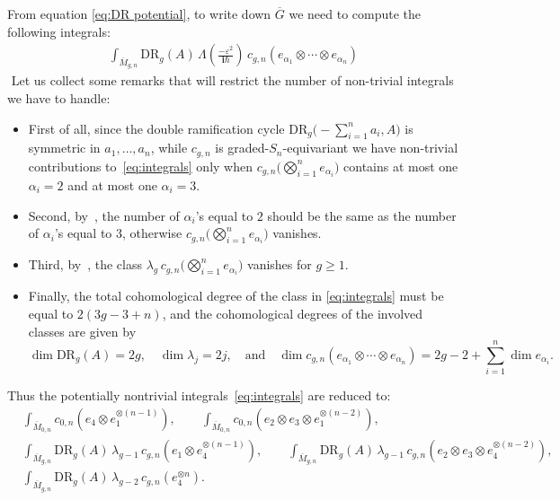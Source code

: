 \documentclass{amsart}
\numberwithin{equation}{section} %
\theoremstyle{plain}
\theoremstyle{remark}
\def\cxi{\mathbf{i}}
\begin{document}
From equation \eqref{eq:DR potential}, to write down $\overline{G}$ we need to compute the following integrals:
\begin{align}\label{eq:integrals}
\int_{\overline{M}_{g,n}} \mathrm{DR}_{g}(A)\, \Lambda( \tfrac{-\varepsilon^2}{\cxi\hbar}) \,  c_{g,n}(e_{\alpha_{1}} \otimes \cdots \otimes e_{\alpha_{n}})
\end{align}
﻿
Let us collect some remarks that will restrict the number of non-trivial integrals we have to handle:
\begin{itemize}
	\item First of all, since the double ramification cycle $\mathrm{DR}_{g}\big( -\textstyle\sum_{i=1}^n a_{i}, A\big)$ is symmetric in $a_1,\dots,a_n$, while $c_{g,n}$ is graded-$S_n$-equivariant we have non-trivial contributions to~\eqref{eq:integrals} only when $c_{g,n}\big(\bigotimes_{i=1}^n e_{\alpha_i} \big)$ contains at most one $\alpha_i=2$ and at most one $\alpha_i=3$.
	\item Second, by~\cite{janda-targetcurves}, the number of $\alpha_i$'s equal to $2$ should be the same as the number of $\alpha_i$'s equal to $3$, otherwise $c_{g,n}\big(\bigotimes_{i=1}^n e_{\alpha_i}\big)$ vanishes. 
	\item Third, by~\cite{pixton_oberdieck_23}, the class $\lambda_g \, c_{g,n}\big(\bigotimes_{i=1}^n e_{\alpha_i}\big)$ vanishes for $g\geq 1$.
	\item Finally, the total cohomological degree of the class in \eqref{eq:integrals} must be equal to $2(3g-3+n)$, and the cohomological degrees of the involved classes are given by 
	\[
	\dim \mathrm{DR}_{g}(A) = 2g, \quad \dim \lambda_j = 2j, \quad \text{and} \quad  \dim c_{g,n}(e_{\alpha_{1}} \otimes \cdots \otimes e_{\alpha_{n}}) = 2g-2+\textstyle\sum_{i=1}^n \dim e_{\alpha_i}.
	\]
\end{itemize} 
Thus the potentially nontrivial integrals~\eqref{eq:integrals} are reduced to:
\begin{align} \label{eq:integrals g11 genus 0}
		& \int_{\overline{M}_{0,n}} c_{0,n}(e_4\otimes e_1^{\otimes (n-1)}), \qquad 
		\int_{\overline{M}_{0,n}} c_{0,n}(e_2\otimes e_3\otimes  e_1^{\otimes (n-2)}),  \\
		\label{eq:integrals g11 lambda g-1} 
	& \int_{\overline{M}_{g,n}} \mathrm{DR}_g(A)\, \lambda_{g-1}\, c_{g,n}(e_1\otimes e_4^{\otimes (n-1)}), \qquad  
		\int_{\overline{M}_{g,n}} \mathrm{DR}_g(A)\, \lambda_{g-1}\, c_{g,n}(e_2\otimes e_3\otimes e_4^{\otimes (n-2)}), \\
	\label{eq: integral G11 lambda g-2}
	& \int_{\overline{M}_{g,n}} \mathrm{DR}_g(A)\, \lambda_{g-2}\, c_{g,n}(e_4^{\otimes n}). 
\end{align}
\end{document}
